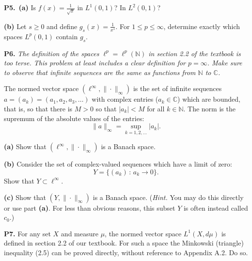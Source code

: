 \documentclass[12pt]{amsart}
\newcommand{\CC}{\mathbb{C}}
\newcommand{\NN}{\mathbb{N}}
\newcommand{\prob}[1]{\bigskip\noindent\textbf{#1.}\quad }
\newcommand{\epart}[1]{\medskip\noindent\textbf{(#1)}\quad }
\newcommand{\ppart}[1]{\,\textbf{(#1)}\quad }
\newcommand{\ds}{\displaystyle}
\begin{document}
\prob{P5}  \ppart{a}  Is $\ds f(x) = \frac{1}{\sqrt{x}}$ in $L^1(0,1)$?  In $L^2(0,1)$?

\epart{b}  Let $s \ge 0$ and define $\ds g_s(x) = \frac{1}{x^s}$.  For $1\le p \le \infty$, determine exactly which spaces $L^p(0,1)$ contain $g_s$.

\prob{P6}  \emph{The definition of the spaces $\ell^p = \ell^p(\NN)$ in section 2.2 of the textbook is too terse.  This problem at least includes a clear definition for $p=\infty$.  Make sure to observe that infinite sequences are the same as functions from $\NN$ to $\CC$.}

\medskip
\noindent The normed vector space $(\ell^\infty,\|\cdot\|_\infty)$ is the set of infinite sequences $a=(a_k)=(a_1,a_2,a_3,\dots)$ with complex entries ($a_k\in\CC$) which are bounded, that is, so that there is $M>0$ so that $|a_k|<M$ for all $k \in\NN$.  The norm is the supremum of the absolute values of the entries:
	$$\|a\|_\infty = \sup_{k=1,2,\dots} |a_k|.$$

\epart{a}  Show that $(\ell^\infty,\|\cdot\|_\infty)$ is a Banach space.

\epart{b}  Consider the set of complex-valued sequences which have a limit of zero:
	$$Y=\{(a_k)\,:\, a_k \to 0\}.$$
Show that $Y \subset \ell^\infty$.

\epart{c}  Show that $(Y,\|\cdot\|_\infty)$ is a Banach space.  (\emph{Hint.}  You may do this directly or use part \textbf{(a)}.  For less than obvious reasons, this subset $Y$ is often instead called $c_0$.)

\prob{P7}  For any set $X$ and measure $\mu$, the normed vector space $L^1(X,d\mu)$ is defined in section 2.2 of our textbook.  For such a space the Minkowski (triangle) inequality (2.5) can be proved directly, without reference to Appendix A.2.  Do so.
\end{document}
